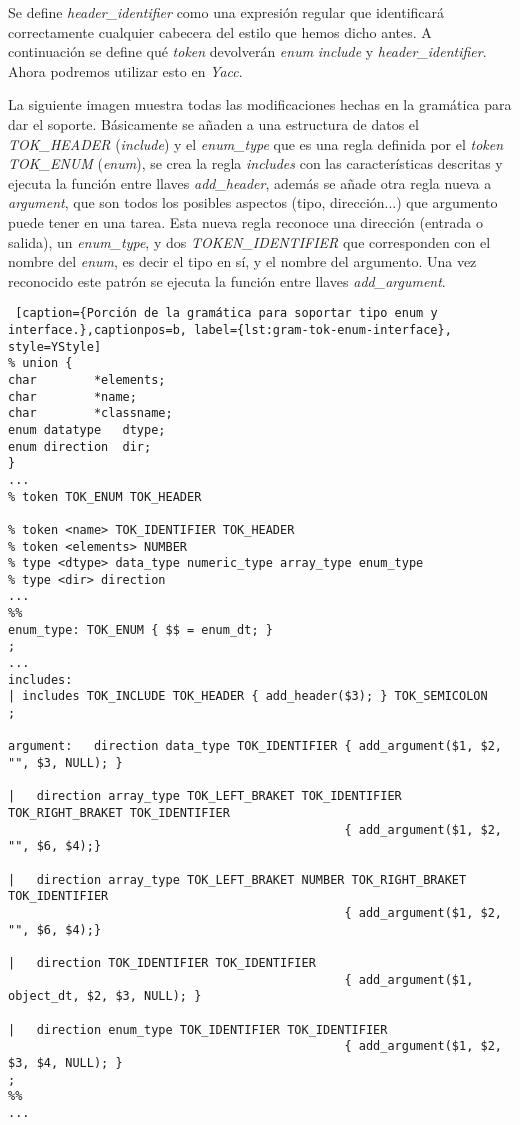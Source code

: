 \par\bigskip
Se define \textit{header\_identifier} como una expresión regular que identificará correctamente cualquier cabecera del estilo que hemos dicho antes. A continuación se define qué \textit{token} devolverán \textit{enum} \textit{include} y \textit{header\_identifier}. Ahora podremos utilizar esto en \textit{Yacc}.

\par\bigskip
La siguiente imagen muestra todas las modificaciones hechas en la gramática para dar el soporte. Básicamente se añaden a una estructura de datos el \textit{TOK\_HEADER} (\textit{include}) y el \textit{enum\_type} que es una regla definida por el \textit{token} \textit{TOK\_ENUM} (\textit{enum}), se crea la regla \textit{includes} con las características descritas y ejecuta la función entre llaves \textit{add\_header}, además se añade otra regla nueva a \textit{argument}, que son todos los posibles aspectos (tipo, dirección...) que argumento puede tener en una tarea. Esta nueva regla reconoce una dirección (entrada o salida), un \textit{enum\_type}, y dos \textit{TOKEN\_IDENTIFIER} que corresponden con el nombre del \textit{enum}, es decir el tipo en sí, y el nombre del argumento. Una vez reconocido este patrón se ejecuta la función entre llaves \textit{add\_argument}.
\bigskip

\begin{minipage}{\linewidth}
\begin{lstlisting} [caption={Porción de la gramática para soportar tipo enum y interface.},captionpos=b, label={lst:gram-tok-enum-interface}, style=YStyle]
% union {
char        *elements;
char        *name;
char        *classname;
enum datatype   dtype;
enum direction  dir;
}
... 
% token TOK_ENUM TOK_HEADER

% token <name> TOK_IDENTIFIER TOK_HEADER
% token <elements> NUMBER
% type <dtype> data_type numeric_type array_type enum_type
% type <dir> direction
...
%%
enum_type: TOK_ENUM { $$ = enum_dt; }
;
...
includes: 
| includes TOK_INCLUDE TOK_HEADER { add_header($3); } TOK_SEMICOLON
;

argument:   direction data_type TOK_IDENTIFIER { add_argument($1, $2, "", $3, NULL); }

|   direction array_type TOK_LEFT_BRAKET TOK_IDENTIFIER TOK_RIGHT_BRAKET TOK_IDENTIFIER 
											   { add_argument($1, $2, "", $6, $4);}
											   
|   direction array_type TOK_LEFT_BRAKET NUMBER TOK_RIGHT_BRAKET TOK_IDENTIFIER 
											   { add_argument($1, $2, "", $6, $4);}
											   
|   direction TOK_IDENTIFIER TOK_IDENTIFIER 
											   { add_argument($1, object_dt, $2, $3, NULL); }
											   
|   direction enum_type TOK_IDENTIFIER TOK_IDENTIFIER 
											   { add_argument($1, $2, $3, $4, NULL); }
;
%%
...
\end{lstlisting}
\end{minipage}


